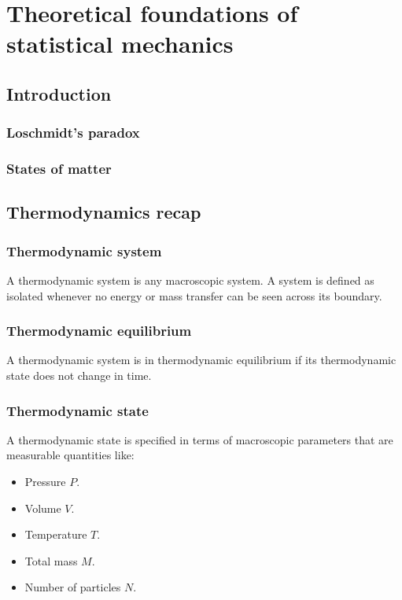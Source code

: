 \chapter{Theoretical foundations of statistical mechanics}

\section{Introduction}

	\subsection{Loschmidt's paradox}

	\subsection{States of matter}

\section{Thermodynamics recap}

	\subsection{Thermodynamic system}
	A thermodynamic system is any macroscopic system.
	A system is defined as isolated whenever no energy or mass transfer can be seen across its boundary.

	\subsection{Thermodynamic equilibrium}
	A thermodynamic system is in thermodynamic equilibrium if its thermodynamic state does not change in time.

	\subsection{Thermodynamic state}
	A thermodynamic state is specified in terms of macroscopic parameters that are measurable quantities like:

	\begin{multicols}{2}
		\begin{itemize}
			\item Pressure $P$.
			\item Volume $V$.
			\item Temperature $T$.
			\item Total mass $M$.
			\item Number of particles $N$.
		\end{itemize}
	\end{multicols}

